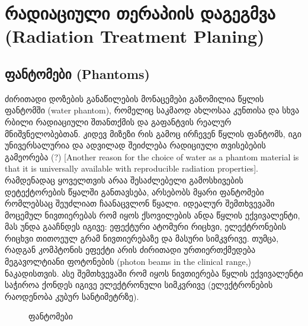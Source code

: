 \documentclass[12pt,a4paper,]{report}
\begin{document}
\section{რადიაციული თერაპიის დაგეგმვა (Radiation Treatment Planing)}
\subsection{ფანტომები (Phantoms)}
ძირითადი დოზების განაწილების მონაცემები გაზომილია წყლის ფანტომში (water phantom), რომელიც საკმაოდ ახლოსაა კუნთისა და სხვა რბილი რადიაციული შთანთქმის და გაფანტვის რეალურ მნიშვნელობებთან. კიდევ მიზეზი რის გამოც ირჩევენ წყლის ფანტომს, იგი უნივერსალურია და ადვილად შეიძლება რადიციული თვისებების გამეორება (?) [Another reason for the choice of water as a phantom material is that it is universally available with reproducible radiation properties]. რამდენადაც ყოველთვის არაა შესაძლებელი გამოსხივების დეტექტორების წყალში განთავსება, არსებობს მყარი ფანტომები რომლებსაც შეუძლიათ ჩაანაცვლონ წყალი. იდეალურ შემთხვევაში მოცემულ ნივთიერებას რომ იყოს ქსოვილების ანდა წყლის ექვივალენტი, მას უნდა გააჩნდეს იგივე: ეფექტური ატომური რიცხვი, ელექტრონების რიცხვი თითოეულ გრამ ნივთიერებაზე და მასური სიმკვრივე. თუმცა, რადგან კომპტონის ეფექტი არის ძირითადი ურთიერთქმედება მეგავოლტიანი ფოტონების (photon beams in the clinical range,) ნაკადისთვის. ასე შემთხვევაში რომ იყოს ნივთიერება წყლის ექვივალენტი საჭიროა ქონდეს იგივე ელექტრონული სიმკვრივე (ელექტრონების რაოდენობა კუბურ სანტიმეტრზე).

	\begin{figure}[h]%
    	\centering
    	\qquad
    	\caption{ფანტომები}%
    	\label{fig:phantom}%
	\end{figure}
	
\end{document}
